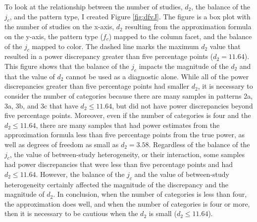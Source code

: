 To look at the relationship between the number of studies, $d_2$, the balance of the $j_c$, and the pattern type, I created Figure  \ref{fig:dfvJ}. The figure is a box plot with the number of studies on the x-axis, $d_2$ resulting from the approximation formula on the y-axis, the pattern type ($f_c$) mapped to the column facet, and the balance of the $j_c$ mapped to color. The dashed line marks the maximum $d_2$ value that resulted in a power discrepancy greater than five percentage points ($d_2 = 11.64$). This figure shows that the balance of the $j_c$ impacts the magnitude of the $d_2$ and that the value of $d_2$ cannot be used as a diagnostic alone. While all of the power discrepancies greater than five percentage points had smaller $d_2$, it is necessary to consider the number of categories because there are many samples in patterns 2a, 3a, 3b, and 3c that have $d_2 \leq 11.64$, but did not have power discrepancies beyond five percentage points. Moreover, even if the number of categories is four and the $d_2 \leq 11.64$, there are many samples that had power estimates from the approximation formula less than five percentage points from the true power, as well as degrees of freedom as small as $d_2 = 3.58$. Regardless of the balance of the $j_c$, the value of between-study heterogeneity, or their interaction, some samples had power discrepancies that were less than five percentage points and had $d_2 \leq 11.64$. However, the balance of the $j_c$ and the value of between-study heterogeneity certainly affected the magnitude of the discrepancy and the magnitude of $d_2$. In conclusion, when the number of categories is less than four, the approximation does well, and when the number of categories is four or more, then it is necessary to be cautious when the $d_2$ is small ($d_2 \leq 11.64$).



